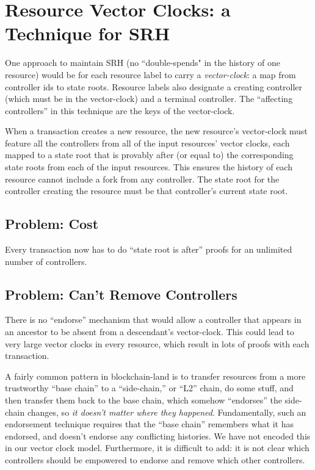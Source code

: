 \documentclass[a4paper,USenglish,cleveref, autoref, thm-restate, anonymous]{lipics-v2021}
\begin{document}


\appendix


\section{Resource Vector Clocks: a Technique for SRH}
\label{sec:resourcevectorclocks}
One approach to maintain SRH (no ``double-spends" in the history of one resource) would be for each resource label to carry a \textit{vector-clock}: a map from controller ids to state roots. 
Resource labels also designate a creating controller (which must be in the vector-clock) and a terminal controller.
The ``affecting controllers'' in this technique are the keys of the vector-clock.

When a transaction creates a new resource, the new resource's vector-clock must feature all the controllers from all of the input resources' vector clocks, each mapped to a state root that is provably after (or equal to) the corresponding state roots from each of the input resources. 
This ensures the history of each resource cannot include a fork from any controller. 
The state root for the controller creating the resource must be that controller's current state root. 

\subsection{Problem: Cost}
Every transaction now has to do ``state root is after'' proofs for an unlimited number of controllers.

\subsection{Problem: Can't Remove Controllers}
There is no ``endorse'' mechanism that would allow a controller that appears in an ancestor to be absent from a descendant's vector-clock. 
This could lead to very large vector clocks in every resource, which result in lots of proofs with each transaction.

A fairly common pattern in blockchain-land is to transfer resources from a more trustworthy ``base chain'' to a ``side-chain,'' or ``L2'' chain, do some stuff, and then transfer them back to the base chain, which somehow ``endorses'' the side-chain changes, so \textit{it doesn't matter where they happened}. 
Fundamentally, such an endorsement technique requires that the ``base chain'' remembers what it has endorsed, and doesn't endorse any conflicting histories. 
We have not encoded this in our vector clock model.
Furthermore, it is difficult to add: it is not clear which controllers should be empowered to endorse and remove which other controllers. 
\end{document}
